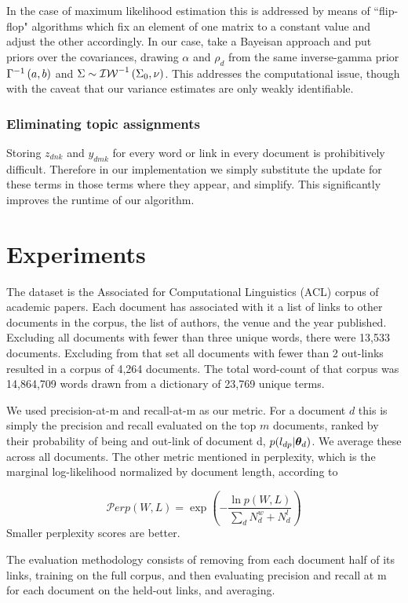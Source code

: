 In the case of maximum likelihood estimation this is addressed by means of ``flip-flop" algorithms\cite{Srivastava2009} which fix an element of one matrix to a constant value and adjust the other accordingly. In our case, take a Bayeisan approach and put priors over the covariances, drawing $\alpha$ and $\rho_d$ from the same inverse-gamma prior ${\Gamma}^{-1}\left(a, b\right)$ and $\Sigma \sim {\mathcal{IW}}^{-1}\left(\Sigma_0, \nu\right)$. This addresses the computational issue, though with the caveat that our variance estimates are only weakly identifiable.

\subsubsection*{Eliminating topic assignments}
Storing $z_{dnk}$ and $y_{dmk}$ for every word or link in every document is prohibitively difficult. Therefore in our implementation we simply substitute the update for these terms in those terms where they appear, and simplify. This significantly improves the runtime of our algorithm. 
\section{Experiments}
The dataset is the Associated for Computational Linguistics (ACL) corpus of academic papers. Each document has associated with it a list of links to other documents in the corpus, the list of authors, the venue and the year published. Excluding all documents with fewer than three unique words, there were 13,533 documents. Excluding from that set all documents with fewer than 2 out-links resulted in a corpus of 4,264 documents. The total word-count of that corpus was 14,864,709 words drawn from a dictionary of 23,769 unique terms.

We used precision-at-m and recall-at-m as our metric. For a document $d$ this is simply the precision and recall evaluated on the top $m$ documents, ranked by their probability of being and out-link of document d, $p(l_{dp} | { \bm \theta_d })$. We average these across all documents. The other metric mentioned in perplexity, which is the marginal log-likelihood normalized by document length, according to 

\begin{equation}
\mathcal{P}erp(W,L) = \exp\left( - \frac{\ln p(W,L)}{\sum_d N^w_d + N^l_d} \right)
\end{equation}
Smaller perplexity scores are better.

The evaluation methodology consists of removing from each document half of its links, training on the full corpus, and then evaluating precision and recall at m for each document on the held-out links, and averaging.

